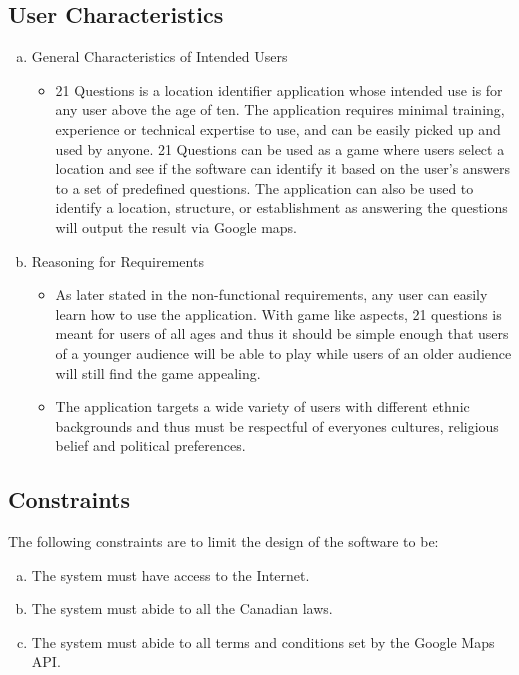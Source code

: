 \documentclass[titlepage]{article}
\newcounter{req}
\begin{document}
		\subsection{User Characteristics}
		\label{sub:user_characteristics}
		\begin{enumerate}[a)]
			\item General Characteristics of Intended Users 
			\begin{itemize}
				\item 21 Questions is a location identifier application whose intended use is for any user above the age of ten. The application requires minimal training, experience or technical expertise to use, and can be easily picked up and used by anyone. 21 Questions can be used as a game where users select a location and see if the software can identify it based on the user's answers to a set of predefined questions. The application can also be used to identify a location, structure, or establishment as answering the questions will output the result via Google maps. 
			\end{itemize}
			\item Reasoning for Requirements
			\begin{itemize}
				\item As later stated in the non-functional requirements, any user can easily learn how to use the application. With game like aspects, 21 questions is meant for users of all ages and thus it should be simple enough that users of a younger audience will be able to play while users of an older audience will still find the game appealing.
				\item The application targets a wide variety of users with different ethnic backgrounds and thus must be respectful of everyones cultures, religious belief and political preferences.
			\end{itemize}
		\end{enumerate}
		
		
		\subsection{Constraints}
		\label{sub:constraints}
		The following constraints are to limit the design of the software to be:
		
		\begin{enumerate}[a)]
			\item The system must have access to the Internet.
			\item The system must abide to all the Canadian laws.
			\item The system must abide to all terms and conditions set by the Google Maps API.
		\end{enumerate}
		
\end{document}
